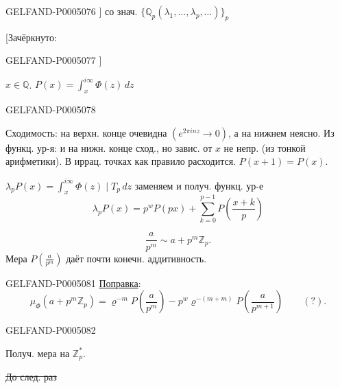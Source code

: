 \begin{GelfandAdjacentEvidence}{GELFAND-P000507}{6}
]
со знач. $\{\mathbb Q_p(\lambda_1,\ldots,\lambda_p,\ldots)\}_p$

[Зачёркнуто: 
\end{GelfandAdjacentEvidence}
\begin{GelfandAdjacentEvidence}{GELFAND-P000507}{7}
]

$x\in\mathbb Q$.\qquad
$P(x)=\displaystyle\int_x^{i\infty}\Phi(z)\,dz$
\end{GelfandAdjacentEvidence}
\begin{GelfandAdjacentEvidence}{GELFAND-P000507}{8}


Сходимость: на верхн. конце очевидна $(e^{2\pi inz}\to0)$, а на нижнем неясно.
Из функц. ур-я: и на нижн. конце сход., но завис. от $x$ не непр. (из тонкой арифметики).
В иррац. точках как правило расходится. $P(x+1)=P(x)$.

$\lambda_pP(x)=\displaystyle\int_x^{i\infty}\Phi(z)\mid T_p\,dz$
заменяем и получ. функц. ур-е
\[
\lambda_pP(x)=p^wP(px)+\sum_{k=0}^{p-1}P\left(\frac{x+k}{p}\right)
\]
\end{GelfandAdjacentEvidence}

\[
\frac{a}{p^m}\sim a+p^m\mathbb Z_p.
\]
Мера $P\left(\frac{a}{p^m}\right)$ даёт почти конечн. аддитивность.


\begin{GelfandAdjacentEvidence}{GELFAND-P000508}{1}
\uline{Поправка}:
\[
\mu_\Phi(a+p^m\mathbb Z_p)=
\varrho^{-m}P\left(\frac{a}{p^m}\right)
-p^w\varrho^{-(m+m)}P\left(\frac{a}{p^{m+1}}\right)\qquad (?).
\]
\end{GelfandAdjacentEvidence}
\begin{GelfandAdjacentEvidence}{GELFAND-P000508}{2}


Получ. мера на $\mathbb Z_p^*$.

\sout{До след. раз}
\end{GelfandAdjacentEvidence}


